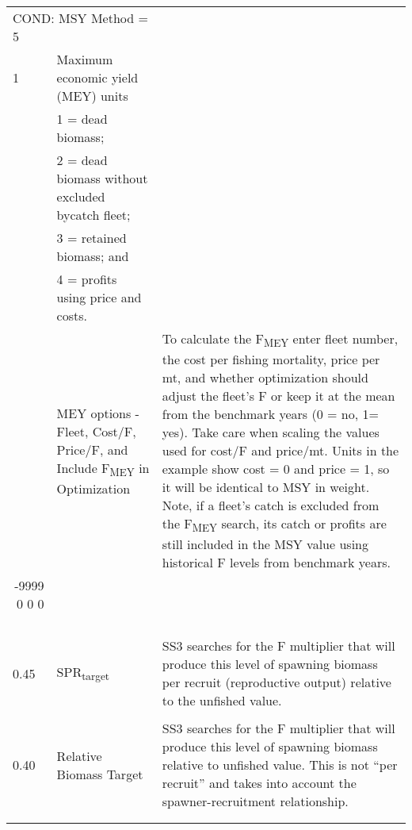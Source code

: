 \begin{landscape}
{\begin{longtable}{p{2cm} p{7cm} p{12cm}}
  \multicolumn{2}{l}{COND: MSY Method = 5} & \Tstrut\\
  1 & Maximum economic yield (MEY) units & \\
    & 1 = dead biomass; & \\
    & 2 = dead biomass without excluded bycatch fleet; & \\
    & 3 = retained biomass; and & \\
    & 4 = profits using price and costs. & \Bstrut\\

  \pagebreak
  
  \multicolumn{1}{r}{1 0 0 1} & MEY options - Fleet, Cost/F, Price/F, and Include F\textsubscript{MEY} in Optimization & \multirow{1}{1cm}[-0.2cm]{\parbox{12cm}{To calculate the F\textsubscript{MEY} enter fleet number, the cost per fishing mortality, price per mt, and whether optimization should adjust the fleet's F or keep it at the mean from the benchmark years (0 = no, 1= yes). Take care when scaling the values used for cost/F and price/mt. Units in the example show cost = 0 and price = 1, so it will be identical to MSY in weight. Note, if a fleet's catch is excluded from the F\textsubscript{MEY} search, its catch or profits are still included in the MSY value using historical F levels from benchmark years.}} \Tstrut\Bstrut\\
  \multicolumn{1}{r}{-9999 0 0 0} & & \\
    & & \\
    & & \\
    & & \\
    & & \\

  \hline
  0.45 & SPR\textsubscript{target} & \multirow{1}{1cm}[-0.15cm]{\parbox{12cm}{SS3 searches for the F multiplier that will produce this level of spawning biomass per recruit (reproductive output) relative to the unfished value.}} \Tstrut\Bstrut\\
    & & \Bstrut\\
  
  \hline
  0.40 & Relative Biomass Target & \multirow{1}{1cm}[-0.15cm]{\parbox{12cm}{SS3 searches for the F multiplier that will produce this level of spawning biomass relative to unfished value. This is not ``per recruit'' and takes into account the spawner-recruitment relationship.}} \Tstrut\Bstrut\\
    & & \\
    & & \\


\end{longtable}}
\end{landscape}

